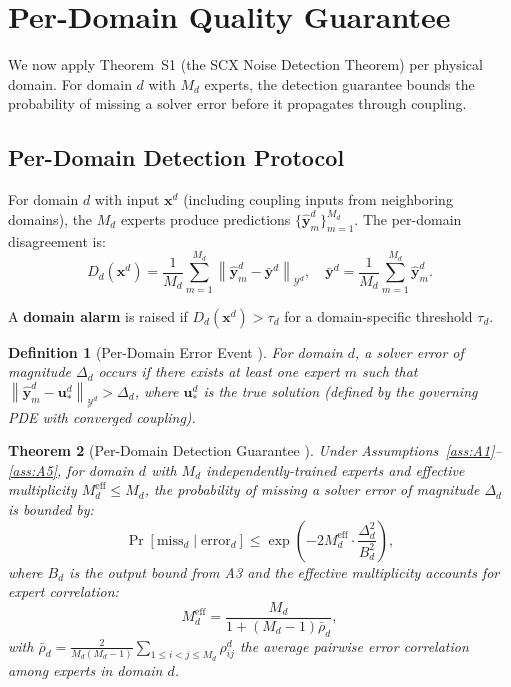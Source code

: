 \documentclass[11pt,a4paper]{article}
\newtheorem{theorem}{Theorem}[section]
\newtheorem{definition}[theorem]{Definition}
\theoremstyle{definition}
\newcommand{\norm}[1]{\left\lVert#1\right\rVert}
\newcommand{\ThmSCXNoise}{Theorem~S1}
\begin{document}
\section{Per-Domain Quality Guarantee }
\label{sec:per_domain}

We now apply \ThmSCXNoise{} (the SCX Noise Detection Theorem) per physical domain. For domain $d$ with $M_d$ experts, the detection guarantee bounds the probability of missing a solver error before it propagates through coupling.

\subsection{Per-Domain Detection Protocol}

For domain $d$ with input $\mathbf{x}^d$ (including coupling inputs from neighboring domains), the $M_d$ experts produce predictions $\{\hat{\mathbf{y}}_m^d\}_{m=1}^{M_d}$. The per-domain disagreement is:
\begin{equation}\label{eq:domain_disagreement}
D_d(\mathbf{x}^d) = \frac{1}{M_d}\sum_{m=1}^{M_d} \norm{\hat{\mathbf{y}}_m^d - \bar{\mathbf{y}}^d}_{\mathcal{Y}^d}, \quad \bar{\mathbf{y}}^d = \frac{1}{M_d}\sum_{m=1}^{M_d} \hat{\mathbf{y}}_m^d.
\end{equation}

A \textbf{domain alarm} is raised if $D_d(\mathbf{x}^d) > \tau_d$ for a domain-specific threshold $\tau_d$.

\begin{definition}[Per-Domain Error Event ]\label{def:domain_error}
For domain $d$, a solver error of magnitude $\Delta_d$ occurs if there exists at least one expert $m$ such that $\norm{\hat{\mathbf{y}}_m^d - \mathbf{u}_*^d}_{\mathcal{Y}^d} > \Delta_d$, where $\mathbf{u}_*^d$ is the true solution (defined by the governing PDE with converged coupling).
\end{definition}

\begin{theorem}[Per-Domain Detection Guarantee ]\label{thm:per_domain}
Under Assumptions~\ref{ass:A1}--\ref{ass:A5}, for domain $d$ with $M_d$ independently-trained experts and effective multiplicity $M_d^{\mathrm{eff}} \leq M_d$, the probability of missing a solver error of magnitude $\Delta_d$ is bounded by:
\begin{equation}\label{eq:per_domain_bound}
\Pr[\text{miss}_d \mid \text{error}_d] \leq \exp\left(-2 M_d^{\mathrm{eff}} \cdot \frac{\Delta_d^2}{B_d^2}\right),
\end{equation}
where $B_d$ is the output bound from A3 and the effective multiplicity accounts for expert correlation:
\begin{equation}\label{eq:meff_domain}
M_d^{\mathrm{eff}} = \frac{M_d}{1 + (M_d - 1)\bar{\rho}_d},
\end{equation}
with $\bar{\rho}_d = \frac{2}{M_d(M_d-1)}\sum_{1 \leq i < j \leq M_d} \rho_{ij}^d$ the average pairwise error correlation among experts in domain $d$.
\end{theorem}
\end{document}
